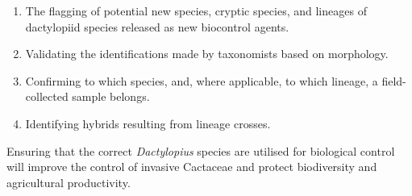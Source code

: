 \begin{enumerate}
    \item The flagging of potential new species, cryptic species, and lineages of dactylopiid species released as new biocontrol agents.
    \item Validating the identifications made by taxonomists based on morphology.
    \item Confirming to which species, and, where applicable, to which lineage, a field-collected sample belongs.
    \item Identifying hybrids resulting from lineage crosses.
\end{enumerate}
 Ensuring that the correct \textit{Dactylopius} species are utilised for biological control will improve the control of invasive Cactaceae and protect biodiversity and agricultural productivity.
 

